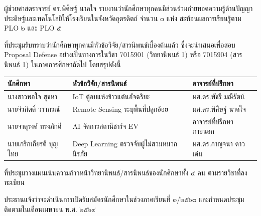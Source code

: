 \documentclass{meetingminutes}
\begin{document}
ผู้ช่วยศาสตราจารย์ ดร.พิศิษฐ์ นาคใจ รายงานว่านักศึกษาทุกคนมีส่วนร่วมถ่ายทอดความรู้ด้านปัญญาประดิษฐ์และเทคโนโลยีให้โรงเรียนในจังหวัดอุตรดิตถ์ จำนวน ๓ แห่ง สะท้อนผลการเรียนรู้ตาม PLO ๒ และ PLO ๕



ที่ประชุมรับทราบว่านักศึกษาทุกคนมีหัวข้อวิจัย/สารนิพนธ์เบื้องต้นแล้ว ซึ่งจะนำเสนอเพื่อสอบ Proposal Defense อย่างเป็นทางการในวิชา 7015901 (วิทยานิพนธ์ 1) หรือ 7015904 (สารนิพนธ์ 1) ในภาคการศึกษาถัดไป โดยสรุปดังนี้

\begin{tabularx}{\linewidth}{|>{\RaggedRight\arraybackslash}p{3.2cm}|>{\RaggedRight\arraybackslash}X|>{\RaggedRight\arraybackslash}p{4.8cm}|}
  \hline
  \textbf{นักศึกษา} & \textbf{หัวข้อวิจัย/สารนิพนธ์} & \textbf{อาจารย์ที่ปรึกษา} \\
  \hline
  นางสาวพอใจ สุขหา & IoT ตู้อบแห้งข้าวแต๋นอัจฉริยะ & ผศ.ดร.พัชรี มณีรัตน์ \\
  \hline
  นายจิรกิตติ์ วราภรณ์ & Remote Sensing ระบุพื้นที่ปลูกอ้อย & ผศ.ดร.พิศิษฐ์ นาคใจ \\
  \hline
  นายจาตุรงค์ ทรงภักดี & AI จัดการสถานีชาร์จ EV & อาจารย์ที่ปรึกษาภายนอก \\
  \hline
  นายเกริกเกียรติ บุญไทย & Deep Learning ตรวจจับผู้ไม่สวมหมวกนิรภัย & ผศ.ดร.กาญจนา ดาวเด่น \\
  \hline
\end{tabularx}




ที่ประชุมวางแผนเน้นความก้าวหน้าวิทยานิพนธ์/สารนิพนธ์ของนักศึกษาทั้ง ๔ คน ตามรายวิชาที่ลงทะเบียน



ประธานแจ้งว่าจะดำเนินการเปิดรับสมัครนักศึกษาในช่วงภาคเรียนที่ ๓/๒๕๖๘ และกำหนดประชุมติดตามในเดือนเมษายน พ.ศ. ๒๕๖๙


\adjournmeeting

\begin{sigblock}
\end{sigblock}
\end{document}
